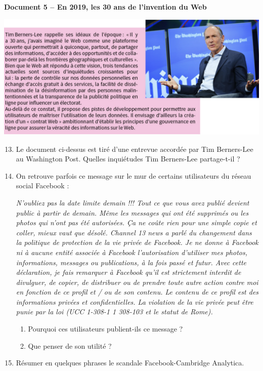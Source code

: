 \documentclass[a4paper]{article}
\begin{document}
\bigskip

\textbf{Document 5 -- En 2019, les 30 ans de l'invention du Web} 

\begin{center}
  \includegraphics[width=16cm]{tim_berners-lee_entrevue_washington_post.png}
\end{center}

\begin{enumerate}
  \setcounter{enumi}{12}
  \item Le document ci-dessus est tiré d'une entrevue accordée par Tim Berners-Lee au Washington Post. Quelles inquiétudes Tim Berners-Lee partage-t-il ?
  \item On retrouve parfois ce message sur le mur de certains utilisateurs du réseau social Facebook :

    \begin{center}
      \textit{N'oubliez pas la date limite demain !!! Tout ce que vous avez publié devient public à partir de demain. Même les messages qui ont été supprimés ou les photos qui n'ont pas été autorisées. Ça ne coûte rien pour une simple copie et coller, mieux vaut que désolé. Channel 13 news a parlé du changement dans la politique de protection de la vie privée de Facebook. Je ne donne à Facebook ni à aucune entité associée à Facebook l'autorisation d'utiliser mes photos, informations, messages ou publications, à la fois passé et futur. Avec cette déclaration, je fais remarquer à Facebook qu'il est strictement interdit de divulguer, de copier, de distribuer ou de prendre toute autre action contre moi en fonction de ce profil et / ou de son contenu. Le contenu de ce profil est des informations privées et confidentielles. La violation de la vie privée peut être punie par la loi (UCC 1-308-1 1 308-103 et le statut de Rome).}
    \end{center}

    \begin{enumerate}[resume]
      \item Pourquoi ces utilisateurs publient-ils ce message ?
      \item Que penser de son utilité ?
    \end{enumerate}
  \item Résumer en quelques phrases le scandale Facebook-Cambridge Analytica.
\end{enumerate}
\end{document}
